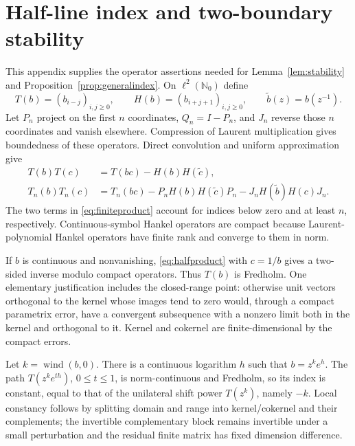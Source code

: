 \documentclass[11pt]{article}
\theoremstyle{definition}
\newcommand{\N}{\mathbb N}
\newcommand{\wind}{\operatorname{wind}}
\begin{document}
\section{Half-line index and two-boundary stability}\label{sec:stability}
This appendix supplies the operator assertions needed for Lemma~\ref{lem:stability} and Proposition~\ref{prop:generalindex}. On $\ell^2(\N_0)$ define
\[
 T(b)=(b_{i-j})_{i,j\ge0},\qquad H(b)=(b_{i+j+1})_{i,j\ge0},
 \qquad\widetilde b(z)=b(z^{-1}).
\]
Let $P_n$ project on the first $n$ coordinates, $Q_n=I-P_n$, and $J_n$ reverse those $n$ coordinates and vanish elsewhere. Compression of Laurent multiplication gives boundedness of these operators. Direct convolution and uniform approximation give
\begin{align}
 T(b)T(c)&=T(bc)-H(b)H(\widetilde c),\label{eq:halfproduct}\\
 T_n(b)T_n(c)&=T_n(bc)-P_nH(b)H(\widetilde c)P_n
              -J_nH(\widetilde b)H(c)J_n.\label{eq:finiteproduct}
\end{align}
The two terms in \eqref{eq:finiteproduct} account for indices below zero and at least $n$, respectively. Continuous-symbol Hankel operators are compact because Laurent-polynomial Hankel operators have finite rank and converge to them in norm.

If $b$ is continuous and nonvanishing, \eqref{eq:halfproduct} with $c=1/b$ gives a two-sided inverse modulo compact operators. Thus $T(b)$ is Fredholm. One elementary justification includes the closed-range point: otherwise unit vectors orthogonal to the kernel whose images tend to zero would, through a compact parametrix error, have a convergent subsequence with a nonzero limit both in the kernel and orthogonal to it. Kernel and cokernel are finite-dimensional by the compact errors.

Let $k=\wind(b,0)$. There is a continuous logarithm $h$ such that $b=z^ke^h$. The path $T(z^ke^{th})$, $0\le t\le1$, is norm-continuous and Fredholm, so its index is constant, equal to that of the unilateral shift power $T(z^k)$, namely $-k$. Local constancy follows by splitting domain and range into kernel/cokernel and their complements; the invertible complementary block remains invertible under a small perturbation and the residual finite matrix has fixed dimension difference.
\end{document}

